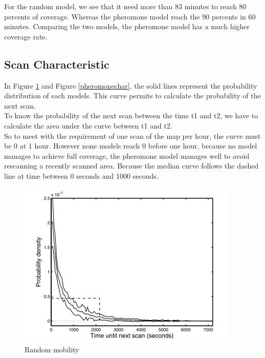 For the random model, we see that it need more than 83 minutes to reach 80 percents of coverage. Whereas the pheromone model reach the 90 percents in 60 minutes. Comparing the two models, the pheromone model has a much higher coverage rate.

\newpage

\subsection{Scan Characteristic}

In Figure \ref{randomchar} and Figure \ref{pheromonechar}, the solid lines represent the probability distribution of each models. This curve permits to calculate the probability of the next scan.\\
To know the probability of the next scan between the time t1 and t2, we have to calculate the area under the curve between t1 and t2.\\
So to meet with the requirement of one scan of the map per hour, the curve must be 0 at 1 hour. However none models reach 0 before one hour, because no model manages to achieve full coverage, the pheromone model manages well to avoid rescanning a recently scanned area. Because the median curve follows the dashed line at time between 0 seconds and 1000 seconds.

\begin{figure}[!h]
\caption{\label{randomchar} Random mobility}
   \includegraphics{../images/random_scan_characteristic.png}
\end{figure}

